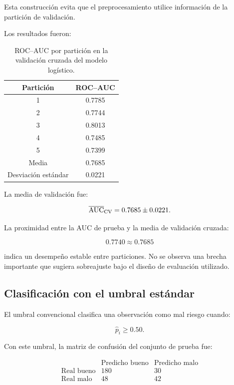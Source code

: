 Esta construcción evita que el preprocesamiento utilice información de
la partición de validación.

Los resultados fueron:

\begin{table}[H]
    \centering
    \caption{ROC--AUC por partición en la validación cruzada del modelo
    logístico.}
    \label{tab:cv-logit}

    \begin{tabular}{cc}
        \toprule
        Partición & ROC--AUC \\
        \midrule
        1 & \num{0.7785} \\
        2 & \num{0.7744} \\
        3 & \num{0.8013} \\
        4 & \num{0.7485} \\
        5 & \num{0.7399} \\
        \midrule
        Media & \num{0.7685} \\
        Desviación estándar & \num{0.0221} \\
        \bottomrule
    \end{tabular}
\end{table}

La media de validación fue:

\[
\overline{\mathrm{AUC}}_{\mathrm{CV}}
=
0.7685
\pm
0.0221.
\]

La proximidad entre la AUC de prueba y la media de validación cruzada:

\[
0.7740
\approx
0.7685
\]

indica un desempeño estable entre particiones. No se observa una brecha
importante que sugiera sobreajuste bajo el diseño de evaluación
utilizado.

\subsection{Clasificación con el umbral estándar}

El umbral convencional clasifica una observación como mal riesgo cuando:

\[
\widehat{p}_i
\geq
0.50.
\]

Con este umbral, la matriz de confusión del conjunto de prueba fue:

\[
\begin{array}{c|cc}
 & \text{Predicho bueno} & \text{Predicho malo} \\
\hline
\text{Real bueno} & 180 & 30 \\
\text{Real malo}  & 48  & 42
\end{array}
\]

